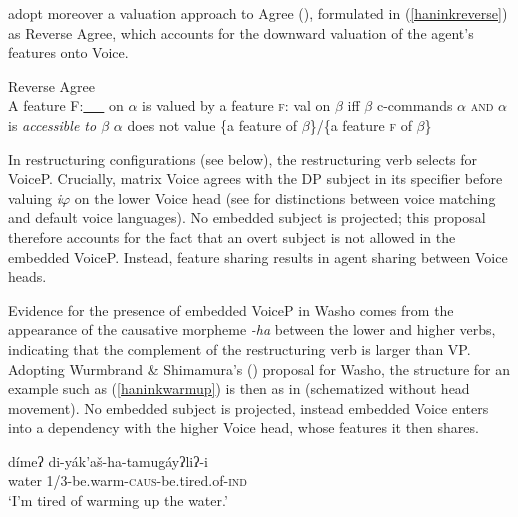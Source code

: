\documentclass[output=paper]{langscibook}
\begin{document}
\z 

\citet{WurmbrandShimamura2017}  adopt moreover a valuation approach to Agree (\citealt{pesetskytorrego2007}), formulated in (\ref{haninkreverse}) as Reverse Agree, which accounts for the downward valuation of the agent's features onto Voice.

\ea Reverse Agree \citep{Wurmbrand2014}\label{haninkreverse}\\
A feature {\scshape F}:\underline{\ \ \ } on $\alpha$ is valued by a feature {\scshape f}: val on $\beta$ iff 
\ea $\beta$ c-commands $\alpha$ {\scshape and}
\ex $\alpha$ is {\itshape accessible to $\beta$}
\ex $\alpha$ does not value \{a feature of $\beta$\}/\{a feature {\scshape f} of $\beta$\}
\z
\z


In restructuring configurations (see below), the restructuring verb selects for VoiceP.  Crucially, matrix Voice agrees with the DP subject in its specifier before valuing {\itshape i}$\varphi$ on the lower Voice head (see \citealt{wurmbrand2015,WurmbrandShimamura2017} for distinctions between voice matching and default voice languages). No embedded subject is projected; this proposal therefore accounts for the fact that an overt subject is not allowed in the embedded VoiceP. Instead, feature sharing results in agent sharing between Voice heads. 


Evidence for the presence of embedded VoiceP in Washo  comes from the appearance of the causative morpheme {\itshape -ha} between the lower and higher verbs, indicating that the complement of the restructuring verb is larger than VP. Adopting  Wurmbrand \& Shimamura's (\citeyear{WurmbrandShimamura2017}) proposal for Washo, the structure for an example such as (\ref{haninkwarmup}) is then as in  (schematized without head movement). No embedded subject is projected, instead embedded Voice enters into a dependency with the higher Voice head, whose features it then shares.
 

\ea \label{haninkwarmup}
\gll dímeʔ di-yák'aš-ha-tamugáyʔliʔ-i\\
water 1/3-be.warm-{\scshape caus}-be.tired.of-{\scshape ind}\\
\glt `I'm tired of warming up the water.'
\z
\end{document}
